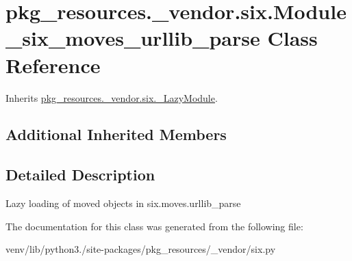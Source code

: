 \hypertarget{classpkg__resources_1_1__vendor_1_1six_1_1_module__six__moves__urllib__parse}{}\section{pkg\+\_\+resources.\+\_\+vendor.\+six.\+Module\+\_\+six\+\_\+moves\+\_\+urllib\+\_\+parse Class Reference}
\label{classpkg__resources_1_1__vendor_1_1six_1_1_module__six__moves__urllib__parse}


Inherits \hyperlink{classpkg__resources_1_1__vendor_1_1six_1_1___lazy_module}{pkg\+\_\+resources.\+\_\+vendor.\+six.\+\_\+\+Lazy\+Module}.

\subsection*{Additional Inherited Members}


\subsection{Detailed Description}
\begin{DoxyVerb}Lazy loading of moved objects in six.moves.urllib_parse\end{DoxyVerb}
 

The documentation for this class was generated from the following file\+:\begin{DoxyCompactItemize}
\item 
venv/lib/python3./site-\/packages/pkg\+\_\+resources/\+\_\+vendor/six.\+py\end{DoxyCompactItemize}

